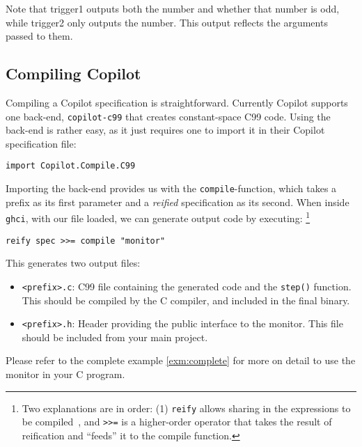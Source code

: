 Note that trigger1 outputs both the number and whether that number is odd,
while trigger2 only outputs the number. This output reflects the arguments
	passed to them. 

\subsection{Compiling Copilot} \label{sec:compiling}

Compiling a Copilot specification is straightforward. Currently Copilot
supports one back-end, \texttt{copilot-c99} that creates constant-space C99
code. Using the back-end is rather easy, as it just requires one to import it in
their Copilot specification file:

\begin{lstlisting}[language = Copilot]
import Copilot.Compile.C99
\end{lstlisting}

Importing the back-end provides us with the \texttt{compile}-function, which
takes a prefix as its first parameter and a \textit{reified} specification as
its second. When inside \texttt{ghci}, with our file loaded, we can generate
output code by executing:
\footnote{Two explanations are in order: (1) {\tt reify} allows sharing in the
expressions to be compiled~\cite{DSLExtract}, and {\tt >>=} is a higher-order
operator that takes the result of reification and ``feeds'' it to the compile
function.}
\begin{lstlisting}[language = Copilot]
reify spec >>= compile "monitor"
\end{lstlisting}

This generates two output files:
\begin{itemize}
  \item \texttt{<prefix>.c}: C99 file containing the generated code and the
  \texttt{step()} function. This should be compiled by the C compiler, and
  included in the final binary.
  \item \texttt{<prefix>.h}: Header providing the public interface to the
  monitor. This file should be included from your main project.
\end{itemize}

Please refer to the complete example \ref{exm:complete} for more on detail to
use the monitor in your C program.
